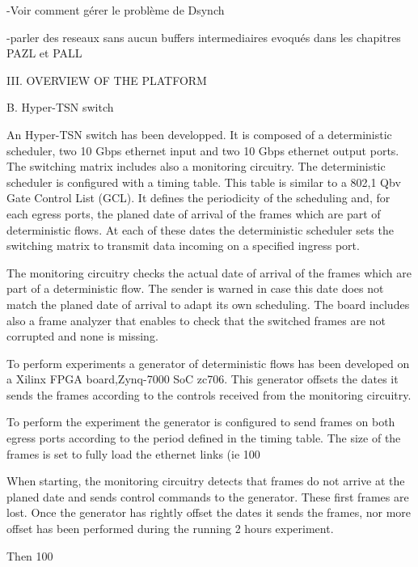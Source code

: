 -Voir comment gérer le problème de Dsynch

-parler des reseaux sans aucun buffers intermediaires evoqués dans les chapitres PAZL et PALL





III. OVERVIEW OF THE PLATFORM

B. Hyper-TSN switch

An Hyper-TSN switch has been developped. It is composed of a deterministic scheduler, two 10 Gbps ethernet input and two 10 Gbps ethernet output ports. The switching matrix includes also a monitoring circuitry. The deterministic scheduler is configured with a timing table. This table is similar to a 802,1 Qbv Gate Control List (GCL). It defines the periodicity of the scheduling and, for each egress ports, the planed date of arrival of the frames which are part of deterministic flows. At each of these dates the deterministic scheduler sets the switching matrix to transmit data incoming on a specified ingress port.

The monitoring circuitry checks the actual date of arrival of the frames which are part of a deterministic flow. The sender is warned in case this date does not match the planed date of arrival to adapt its own scheduling. The board includes also a frame analyzer that enables to check that the switched frames are not corrupted and none is missing.

To perform experiments a generator of deterministic flows has been developed on a Xilinx FPGA board,Zynq-7000 SoC zc706. This generator offsets the dates it sends the frames according to the controls received from the monitoring circuitry.

To perform the experiment the generator is configured to send frames on both egress ports according to the period defined in the timing table. The size of the frames is set to fully load the ethernet links (ie 100%

When starting, the monitoring circuitry detects that frames do not arrive at the planed date and sends control commands to the generator. These first frames are lost. Once the generator has rightly offset the dates it sends the frames, nor more offset has been performed during the running 2 hours experiment.

Then 100%

